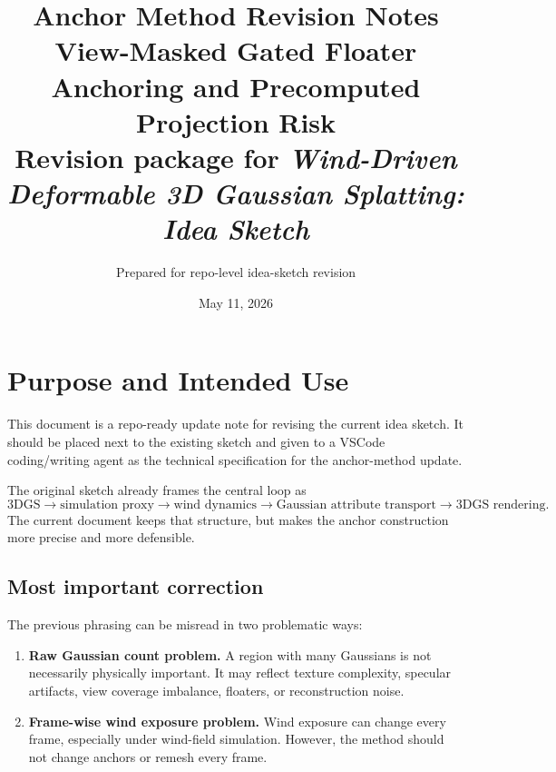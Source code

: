 \documentclass[11pt,a4paper]{article}
\title{\textbf{Anchor Method Revision Notes}\\
\large View-Masked Gated Floater Anchoring and Precomputed Projection Risk\\
\normalsize Revision package for \textit{Wind-Driven Deformable 3D Gaussian Splatting: Idea Sketch}}
\author{Prepared for repo-level idea-sketch revision}
\date{May 11, 2026}
\begin{document}
\maketitle

\begin{center}
\end{center}

\section{Purpose and Intended Use}

This document is a repo-ready update note for revising the current idea sketch. It should be placed next to the existing sketch and given to a VSCode coding/writing agent as the technical specification for the anchor-method update.

The original sketch already frames the central loop as
\[
\text{3DGS} \rightarrow \text{simulation proxy} \rightarrow \text{wind dynamics} \rightarrow \text{Gaussian attribute transport} \rightarrow \text{3DGS rendering}.
\]
The current document keeps that structure, but makes the anchor construction more precise and more defensible.

\subsection{Most important correction}

The previous phrasing can be misread in two problematic ways:

\begin{enumerate}[leftmargin=2em]
\item \textbf{Raw Gaussian count problem.} A region with many Gaussians is not necessarily physically important. It may reflect texture complexity, specular artifacts, view coverage imbalance, floaters, or reconstruction noise.
\item \textbf{Frame-wise wind exposure problem.} Wind exposure can change every frame, especially under wind-field simulation. However, the method should not change anchors or remesh every frame.
\end{enumerate}
\end{document}
